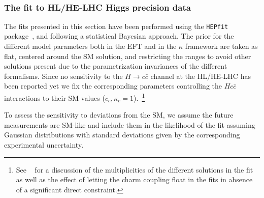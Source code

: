\\ 

\subsubsection{The fit to HL/HE-LHC Higgs precision data}\label{sec:2:fit}

The fits presented in this section have been performed using the {\tt HEPfit} package~\cite{hepfit,hepfitsite}, and following a statistical Bayesian approach. The prior for the different model parameters both in the EFT and in the $\kappa$ framework are taken as flat, centered around the SM solution, and restricting the ranges to avoid other solutions present due to the parametrization invariances of the different formalisms.
Since no sensitivity to the $H\to c\bar{c}$ channel at the HL/HE-LHC has been reported yet we fix the corresponding parameters controlling the $Hc\bar c$ interactions to their SM values ($c_c,\kappa_c=1$).~\footnote{See ~\cite{deBlas:2018tjm} for a discussion of the multiplicities of the different solutions in the fit as well as the effect of letting the charm coupling float in the fits in absence of a significant direct constraint.}

To assess the sensitivity to deviations from the SM, we assume the future measurements are SM-like and include them in the likelihood of the fit assuming Gaussian distributions with standard deviations given by the corresponding experimental uncertainty. 

